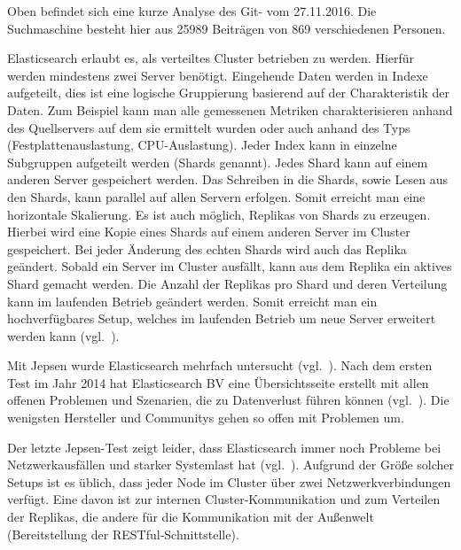 \begin{center}
    \inputminted{text}{../listings/elasticsearch-clone.txt}
\end{center}

Oben befindet sich eine kurze Analyse des \gls{Git}-
 vom 27.11.2016. Die Suchmaschine besteht
hier aus 25989 Beiträgen von 869 verschiedenen Personen.

Elasticsearch erlaubt es, als verteiltes Cluster betrieben zu werden. Hierfür
werden mindestens zwei Server benötigt. Eingehende Daten werden in Indexe
aufgeteilt, dies ist eine logische Gruppierung basierend auf der Charakteristik
der Daten. Zum Beispiel kann man alle gemessenen Metriken charakterisieren
anhand des Quellservers auf dem sie ermittelt wurden oder auch anhand des Typs
(Festplattenauslastung, CPU-Auslastung). Jeder Index kann in einzelne
Subgruppen aufgeteilt werden (Shards genannt). Jedes Shard kann auf einem
anderen Server gespeichert werden. Das Schreiben in die Shards, sowie Lesen aus
den Shards, kann parallel auf allen Servern erfolgen. Somit erreicht man eine
horizontale \gls{Skalierung}. Es ist auch möglich, Replikas von Shards zu
erzeugen. Hierbei wird eine Kopie eines Shards auf einem anderen Server im
Cluster gespeichert. Bei jeder Änderung des echten Shards wird auch das Replika
geändert. Sobald ein Server im Cluster ausfällt, kann aus dem Replika ein
aktives Shard gemacht werden. Die Anzahl der Replikas pro Shard und deren
Verteilung kann im laufenden Betrieb geändert werden. Somit erreicht man ein
hochverfügbares Setup, welches im laufenden Betrieb um neue Server erweitert
werden kann (vgl.~\cite{es_concepts}).

Mit \gls{Jepsen} wurde Elasticsearch mehrfach untersucht
(vgl.~\cite{es_jepsen_all}). Nach dem ersten Test im Jahr 2014 hat
Elasticsearch BV eine Übersichtsseite erstellt mit allen offenen Problemen und
Szenarien, die zu Datenverlust führen können (vgl.~\cite{es_resiliency}). Die
wenigsten Hersteller und Communitys gehen so offen mit Problemen um.

Der letzte Jepsen-Test zeigt leider, dass Elasticsearch immer noch Probleme bei
Netzwerkausfällen und starker Systemlast hat (vgl.~\cite{jepsen_elastic}).
Aufgrund der Größe solcher Setups ist es üblich, dass jeder Node im Cluster
über zwei Netzwerkverbindungen verfügt. Eine davon ist zur internen
Cluster-Kommunikation und zum Verteilen der Replikas, die andere für die
Kommunikation mit der Außenwelt (Bereitstellung der RESTful-Schnittstelle).

